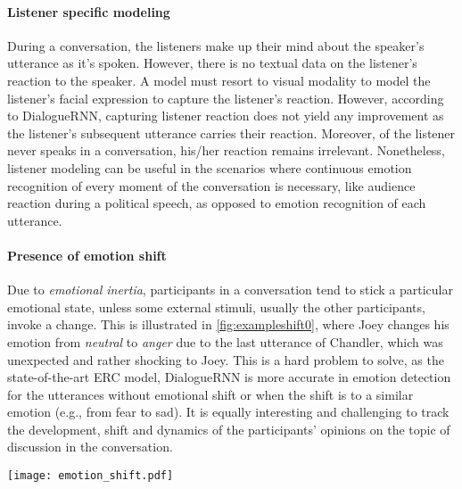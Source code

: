 \documentclass{IEEEtran}\usepackage[pdftex]{graphicx}
\begin{document}
	\paragraph{Listener specific modeling}
	
	During a conversation, the listeners make up their mind about the speaker's utterance as it's
	spoken. However, there is no textual data on the listener's reaction to the speaker. A model
	must resort to visual modality to model the listener's facial expression to capture the
	listener's reaction. However, according to DialogueRNN, capturing listener
	reaction does not yield any improvement as the listener's subsequent utterance carries their
	reaction. Moreover, of the listener never speaks in a conversation, his/her reaction remains
	irrelevant. Nonetheless, listener modeling can be useful in the scenarios where continuous
	emotion recognition of every moment of the conversation is necessary, like audience reaction
	during a political speech, as opposed to emotion recognition of each utterance.
	
	\paragraph{Presence of emotion shift}
	
	Due to \textit{emotional inertia}, participants in a conversation tend to stick a particular emotional state, unless
	some external stimuli, usually the other participants, invoke a change. This is illustrated in \cref{fig:exampleshift0}, where Joey
	changes his emotion from \textit{neutral} to \textit{anger} due to the last utterance of Chandler, which was unexpected and rather shocking to Joey. This is a hard problem
	to solve, as the state-of-the-art ERC model, DialogueRNN is more accurate in emotion detection for the utterances without emotional shift or when the shift is to a similar emotion (e.g., from fear to sad). It is equally interesting and challenging to track the development, shift and dynamics of the participants' opinions on the topic of discussion in the conversation.
	
	\begin{figure*}[h] 
		\centering 
		\small
		\texttt{[image: emotion\_shift.pdf]}
		\caption{ 
			Emotion shift of speakers in a dialogue in comparison with speaker’s previous emotion. Red
			and blue colors are used to show the emotion shift of Joey and Chandler respectively..}
		\label{fig:exampleshift0}
	\end{figure*}
	
\end{document}
